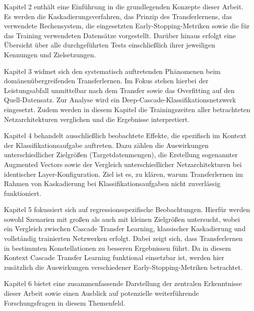 Kapitel 2 enthält eine Einführung in die grundlegenden Konzepte dieser Arbeit. Es werden die Kaskadierungsverfahren, das Prinzip des 
Transferlernens, das verwendete Rechensystem, die eingesetzten Early-Stopping-Metriken sowie die für das Training verwendeten Datensätze 
vorgestellt. Darüber hinaus erfolgt eine Übersicht über alle durchgeführten Tests einschließlich ihrer jeweiligen Kennungen und Zielsetzungen.

Kapitel 3 widmet sich den systematisch auftretenden Phänomenen beim domänenübergreifenden Transferlernen. Im Fokus stehen hierbei der 
Leistungsabfall unmittelbar nach dem Transfer sowie das Overfitting auf den Quell-Datensatz. Zur Analyse wird ein 
Deep-Cascade-Klassifikationsnetzwerk eingesetzt. Zudem werden in diesem Kapitel die Trainingszeiten aller betrachteten Netzarchitekturen 
verglichen und die Ergebnisse interpretiert.

Kapitel 4 behandelt ausschließlich beobachtete Effekte, die spezifisch im Kontext der Klassifikationsaufgabe auftreten. Dazu zählen die 
Auswirkungen unterschiedlicher Zielgrößen (Targetdatenmengen), die Erstellung sogenannter Augmented Vectors sowie der Vergleich 
unterschiedlicher Netzarchitekturen bei identischer Layer-Konfiguration. Ziel ist es, zu klären, warum Transferlernen im Rahmen von 
Kaskadierung bei Klassifikationsaufgaben nicht zuverlässig funktioniert.

Kapitel 5 fokussiert sich auf regressionsspezifische Beobachtungen. Hierfür werden sowohl Szenarien mit großen als auch mit kleinen Zielgrößen 
untersucht, wobei ein Vergleich zwischen Cascade Transfer Learning, klassischer Kaskadierung und vollständig trainierten Netzwerken erfolgt. 
Dabei zeigt sich, dass Transferlernen in bestimmten Konstellationen zu besseren Ergebnissen führt. Da in diesem Kontext Cascade Transfer 
Learning funktional einsetzbar ist, werden hier zusätzlich die Auswirkungen verschiedener Early-Stopping-Metriken betrachtet.

Kapitel 6 bietet eine zusammenfassende Darstellung der zentralen Erkenntnisse dieser Arbeit sowie einen Ausblick auf potenzielle weiterführende 
Forschungsfragen in diesem Themenfeld.

